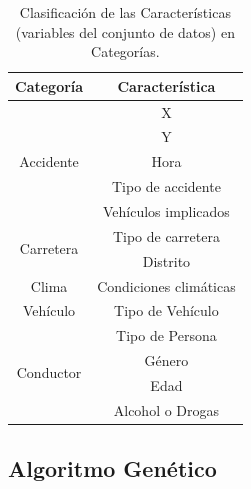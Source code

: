 \documentclass{uathesis-es}
\begin{document}
{		%
		
		
		
		\begin{table}[H]
			\centering
			
			\begin{tabular}{ |c|c| }
				\hline
				\textbf{Categoría} & \textbf{Característica} \\
				\hline
				\hline
				\multirow{5}{*}{Accidente} & X \\
				& Y \\
				& Hora \\
				& Tipo de accidente \\
				& Vehículos implicados \\
				\hline
				\hline
				\multirow{2}{*}{Carretera} & Tipo de carretera \\
				& Distrito \\
				\hline
				\hline
				Clima & Condiciones climáticas \\
				\hline
				\hline
				Vehículo & Tipo de Vehículo \\
				\hline
				\hline
				\multirow{4}{*}{Conductor}  & Tipo de Persona \\
				& Género \\
				& Edad \\
				& Alcohol o Drogas \\
				\hline
				\hline
			\end{tabular}
			
			\caption{Clasificación de las Características (variables del conjunto de datos) en Categorías.}
			\label{JC}
		\end{table}
		
		
		
		\subsection*{Algoritmo Genético}
		
		
}
\end{document}
